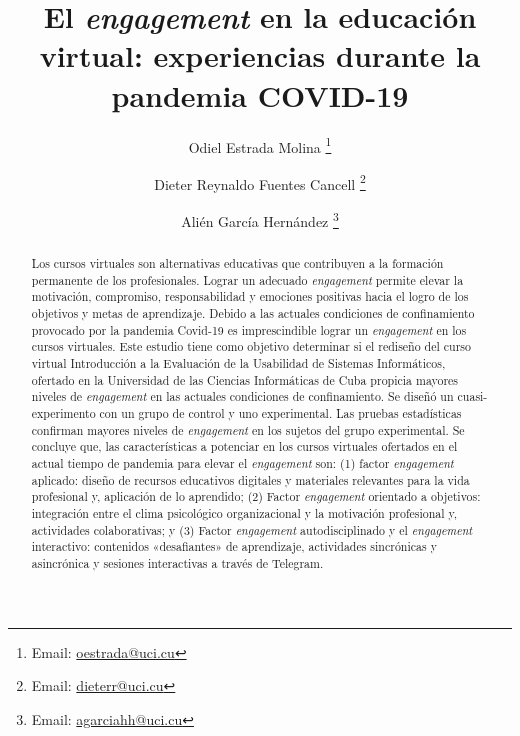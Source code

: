 \documentclass[spanish]{textolivre}
\title{El \textit{engagement} en la educación virtual: experiencias durante la pandemia COVID-19}
\author[1]{Odiel Estrada Molina \orcid{0000-0002-0918-418X} \thanks{Email: \url{oestrada@uci.cu}}}
\author[1]{Dieter Reynaldo Fuentes Cancell \orcid{0000-0002-2509-5400} \thanks{Email: \url{dieterr@uci.cu}}}
\author[1]{Alién García Hernández \orcid{0000-0002-9701-9351} \thanks{Email: \url{agarciahh@uci.cu}}}
\affil[1]{Facultad de Ciencias y Tecnologías Computacionales. Universidad de las Ciencias Informáticas, La Habana, Cuba.}
\begin{document}
\maketitle

\begin{polyabstract}
\begin{abstract}
Los cursos virtuales son alternativas educativas que contribuyen a la formación permanente de los profesionales. Lograr un adecuado \emph{engagement} permite elevar la motivación, compromiso, responsabilidad y emociones positivas hacia el logro de los objetivos y metas de aprendizaje. Debido a las actuales condiciones de confinamiento provocado por la pandemia Covid-19 es imprescindible lograr un \emph{engagement} en los cursos virtuales. Este estudio tiene como objetivo determinar si el rediseño del curso virtual Introducción a la Evaluación de la Usabilidad de Sistemas Informáticos, ofertado en la Universidad de las Ciencias Informáticas de Cuba propicia mayores niveles de \emph{engagement} en las actuales condiciones de confinamiento. Se diseñó un cuasi-experimento con un grupo de control y uno experimental. Las pruebas estadísticas confirman mayores niveles de \emph{engagement} en los sujetos del grupo experimental. Se concluye que, las características a potenciar en los cursos virtuales ofertados en el actual tiempo de pandemia para elevar el \emph{engagement} son: (1) factor \emph{engagement} aplicado: diseño de recursos educativos digitales y materiales relevantes para la vida profesional y, aplicación de lo aprendido; (2) Factor \emph{engagement} orientado a objetivos: integración entre el clima psicológico organizacional y la motivación profesional y, actividades colaborativas; y (3) Factor \emph{engagement} autodisciplinado y el \emph{engagement} interactivo: contenidos «desafiantes» de aprendizaje, actividades sincrónicas y asincrónica y sesiones interactivas a través de Telegram.


\end{abstract}


\end{polyabstract}
\end{document}

